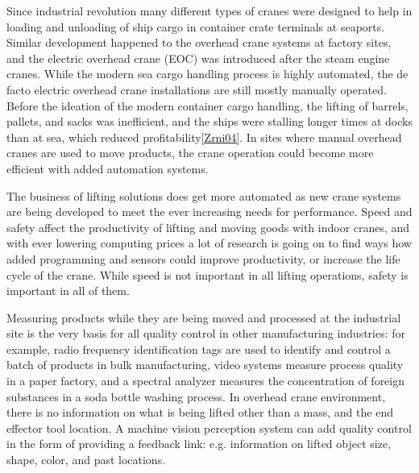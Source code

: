 \documentclass[12pt,a4paper,oneside,pdftex]{report}
\begin{document}
Since industrial revolution many different types of cranes were designed to help in loading and unloading of ship cargo in container crate terminals at seaports. Similar development happened to the overhead crane systems at factory sites, and the electric overhead crane (EOC) was introduced after the steam engine cranes. While the modern sea cargo handling process is highly automated, the de facto electric overhead crane installations are still mostly manually operated. Before the ideation of the modern container cargo handling, the lifting of barrels, pallets, and sacks was inefficient, and the ships were stalling longer times at docks than at sea, which reduced profitability\ref{Zrni04}. In sites where manual overhead cranes are used to move products, the crane operation could become more efficient with added automation systems.

The business of lifting solutions does get more automated as new crane systems are being developed to meet the ever increasing needs for performance. Speed and safety affect the productivity of lifting and moving goods with indoor cranes, and with ever lowering computing prices a lot of research is going on to find ways how added programming and sensors could improve productivity, or increase the life cycle of the crane. While speed is not important in all lifting operations, safety is important in all of them. 

Measuring products while they are being moved and processed at the industrial site is the very basis for all quality control in other manufacturing industries: for example, radio frequency identification tags are used to identify and control a batch of products in bulk manufacturing, video systems measure process quality in a paper factory, and a spectral analyzer measures the concentration of foreign substances in a soda bottle washing process. In overhead crane environment, there is no information on what is being lifted other than a mass, and the end effector tool location. A machine vision perception system can add quality control in the form of providing a feedback link: e.g. information on lifted object size, shape, color, and past locations.

\end{document}
